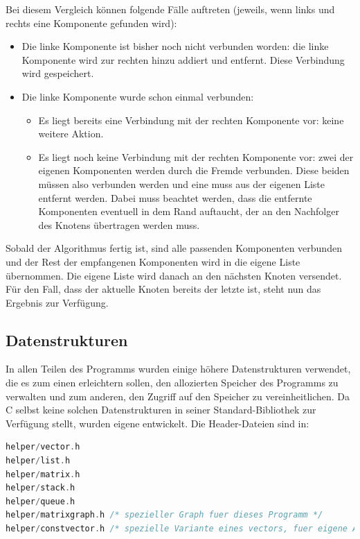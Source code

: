 Bei diesem Vergleich können folgende Fälle auftreten (jeweils, wenn links und rechts eine Komponente gefunden wird):
\begin{itemize}
	\item Die linke Komponente ist bisher noch nicht verbunden worden: die linke Komponente wird zur rechten hinzu addiert und entfernt. Diese Verbindung wird gespeichert.
	\item Die linke Komponente wurde schon einmal verbunden:
		\begin{itemize}
			\item Es liegt bereits eine Verbindung mit der rechten Komponente vor: keine weitere Aktion.
			\item Es liegt noch keine Verbindung mit der rechten Komponente vor: zwei der eigenen Komponenten werden durch die Fremde verbunden. Diese beiden müssen also verbunden werden und eine muss aus der eigenen Liste entfernt werden. Dabei muss beachtet werden, dass die entfernte Komponenten eventuell in dem Rand auftaucht, der an den Nachfolger des Knotens übertragen werden muss.
		\end{itemize}
\end{itemize}

Sobald der Algorithmus fertig ist, sind alle passenden Komponenten verbunden und der Rest der empfangenen Komponenten wird in die eigene Liste übernommen. Die eigene Liste wird danach an den nächsten Knoten versendet. Für den Fall, dass der aktuelle Knoten bereits der letzte ist, steht nun das Ergebnis zur Verfügung.

\subsection{Datenstrukturen} \label{algorithm:ds}

In allen Teilen des Programms wurden einige höhere Datenstrukturen verwendet, die es zum einen erleichtern sollen, den allozierten Speicher des Programms zu verwalten und zum anderen, den Zugriff auf den Speicher zu vereinheitlichen. Da C selbst keine solchen Datenstrukturen in seiner Standard-Bibliothek zur Verfügung stellt, wurden eigene entwickelt. Die Header-Dateien sind in:

\begin{lstlisting}[language=C, aboveskip=\baselineskip, basicstyle=\footnotesize\ttfamily, lineskip=0pt]
helper/vector.h
helper/list.h
helper/matrix.h
helper/stack.h
helper/queue.h
helper/matrixgraph.h /* spezieller Graph fuer dieses Programm */
helper/constvector.h /* spezielle Variante eines vectors, fuer eigene Allokatoren gedacht */
\end{lstlisting}

